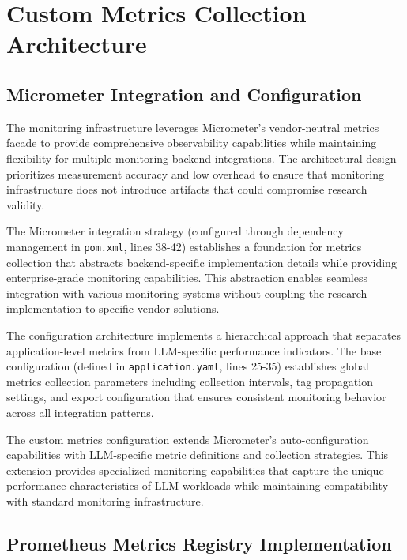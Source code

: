 \section{Custom Metrics Collection Architecture}

\subsection{Micrometer Integration and Configuration}

The monitoring infrastructure leverages Micrometer's vendor-neutral metrics facade to provide comprehensive observability capabilities while maintaining flexibility for multiple monitoring backend integrations. The architectural design prioritizes measurement accuracy and low overhead to ensure that monitoring infrastructure does not introduce artifacts that could compromise research validity.

The Micrometer integration strategy (configured through dependency management in \texttt{pom.xml}, lines 38-42) establishes a foundation for metrics collection that abstracts backend-specific implementation details while providing enterprise-grade monitoring capabilities. This abstraction enables seamless integration with various monitoring systems without coupling the research implementation to specific vendor solutions.


The configuration architecture implements a hierarchical approach that separates application-level metrics from LLM-specific performance indicators. The base configuration (defined in \texttt{application.yaml}, lines 25-35) establishes global metrics collection parameters including collection intervals, tag propagation settings, and export configuration that ensures consistent monitoring behavior across all integration patterns.


The custom metrics configuration extends Micrometer's auto-configuration capabilities with LLM-specific metric definitions and collection strategies. This extension provides specialized monitoring capabilities that capture the unique performance characteristics of LLM workloads while maintaining compatibility with standard monitoring infrastructure.

\subsection{Prometheus Metrics Registry Implementation}

